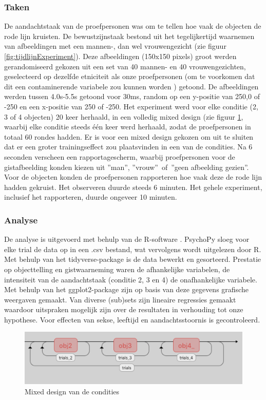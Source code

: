 \documentclass[a4paper,jou]{apa6}  %
\begin{document}
\subsubsection{Taken} De aandachtstaak van de proefpersonen was om te tellen hoe vaak de objecten de rode lijn kruisten. De bewustzijnstaak bestond uit het tegelijkertijd waarnemen van afbeeldingen met een mannen-, dan wel vrouwengezicht (zie figuur \ref{fig:tijdlijnExperiment}). 
Deze afbeeldingen (150x150 pixels) groot werden gerandomiseerd gekozen uit een set van 40 mannen- en 40 vrouwengezichten, geselecteerd op dezelfde etniciteit als onze proefpersonen (om te voorkomen dat dit een contaminerende variabele zou kunnen worden \cite{sporer2001recognizing}) getoond. De afbeeldingen werden tussen 4.0s-5.5s getoond voor 30ms, random op een y-positie van 250,0 of -250 en een x-positie van 250 of -250. Het experiment werd voor elke conditie (2, 3 of 4 objecten) 20 keer herhaald, in een volledig mixed design (zie figuur \ref{fig:mixedDesign}, waarbij elke conditie steeds \'e\'en keer werd herhaald, zodat de proefpersonen in totaal 60 rondes hadden. Er is voor een mixed design gekozen om uit te sluiten dat er een groter trainingseffect zou plaatsvinden in een van de condities. Na 6 seconden verscheen een rapportagescherm, waarbij proefpersonen voor de gistafbeelding konden kiezen uit \textquotedblright man\textquotedblright, \textquotedblright vrouw\textquotedblright\, of\, \textquotedblright geen afbeelding gezien\textquotedblright. Voor de objecten konden de proefpersonen rapporteren hoe vaak deze de rode lijn hadden gekruist. Het observeren duurde steeds 6 minuten. Het gehele experiment, inclusief het rapporteren, duurde ongeveer 10 minuten.

\subsubsection{Analyse}
De analyse is uitgevoerd met behulp van de R-software \cite{Rsoftware}. PsychoPy sloeg voor elke trial de data op in een .csv bestand, wat vervolgens wordt uitgelezen door R. Met behulp van het tidyverse-package \cite{tidyverse} is de data bewerkt en gesorteerd. Prestatie op objecttelling en gistwaarneming waren de afhankelijke variabelen, de intensiteit van de aandachtstaak (conditie 2, 3 en 4) de onafhankelijke variabele. Met behulp van het ggplot2-package \cite{ggplot} zijn op basis van deze gegevens grafische weergaven gemaakt. Van diverse (sub)sets zijn lineaire regressies gemaakt waardoor uitspraken mogelijk zijn over de resultaten in verhouding tot onze hypothese. Voor effecten van sekse, leeftijd en aandachtsstoornis is gecontroleerd.
\begin{figure}
\centering
	\includegraphics[width=1.0\linewidth]{opzetExperiment.png}
    \caption{\label{fig:mixedDesign}Mixed design van de condities}
\end{figure}
\end{document}
